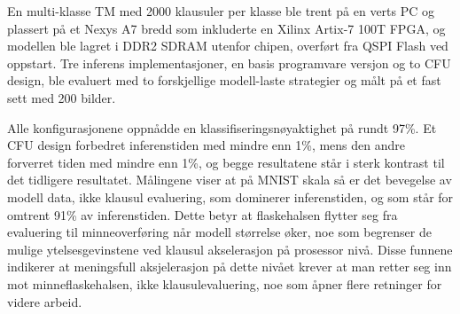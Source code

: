 En multi-klasse TM med 2000 klausuler per klasse ble trent på en verts PC og plassert på et Nexys A7 bredd som inkluderte en Xilinx Artix-7 100T FPGA, og modellen ble lagret i DDR2 SDRAM utenfor chipen, overført fra QSPI Flash ved oppstart. Tre inferens implementasjoner, en basis programvare versjon og to CFU design, ble evaluert med to forskjellige modell-laste strategier og målt på et fast sett med 200 bilder.

Alle konfigurasjonene oppnådde en klassifiseringsnøyaktighet på rundt 97\%. Et CFU design forbedret inferenstiden med mindre enn 1\%, mens den andre forverret tiden med mindre enn 1\%, og begge resultatene står i sterk kontrast til det tidligere resultatet. Målingene viser at på MNIST skala så er det bevegelse av modell data, ikke klausul evaluering, som dominerer inferenstiden, og som står for omtrent 91\% av inferenstiden. Dette betyr at flaskehalsen flytter seg fra evaluering til minneoverføring når modell størrelse øker, noe som begrenser de mulige ytelsesgevinstene ved klausul akselerasjon på prosessor nivå. Disse funnene indikerer at meningsfull aksjelerasjon på dette nivået krever at man retter seg inn mot minneflaskehalsen, ikke klausulevaluering, noe som åpner flere retninger for videre arbeid.

